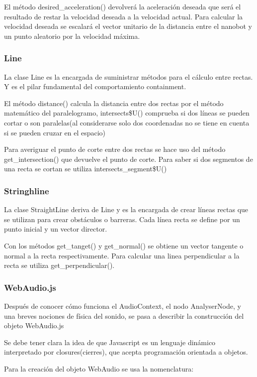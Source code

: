 El método desired\_acceleration() devolverá la aceleración deseada que será el resultado de restar la velocidad deseada a la velocidad actual. Para calcular la velocidad deseada se escalará el vector unitario de la distancia entre el nanobot y un punto aleatorio por la velocidad máxima. 

\subsubsection{Line}
\label{sec:line}
La clase Line es la encargada de suministrar métodos para el cálculo entre rectas. Y es el pilar fundamental del comportamiento containment.

El método distance() calcula la distancia entre dos rectas por el método matemático del paralelogramo, intersects\$U() comprueba si dos líneas se pueden cortar o son paralelas(al considerarse solo dos coordenadas no se tiene en cuenta si se pueden cruzar en el espacio)

Para averiguar el punto de corte entre dos rectas se hace uso del método get\_intersection() que devuelve el punto de corte. Para saber si dos segmentos de una recta se cortan se utiliza intersects\_segment\$U()

\subsubsection{Stringhline}
\label{sec:stringhline}
La clase StraightLine deriva de Line y es la encargada de crear  líneas rectas que se utilizan para crear obstáculos o barreras. Cada línea recta se define por un punto inicial y un vector director. 

Con los métodos get\_tanget() y get\_normal() se obtiene un vector tangente o normal a la recta respectivamente. Para calcular una linea perpendicular a la recta se utiliza get\_perpendicular().

\subsubsection{WebAudio.js}
\label{sec:webaudio}
Después de conocer cómo funciona el AudioContext, el nodo AnalyserNode, y una breves nociones de física del sonido, se pasa a describir la construcción del objeto WebAudio.js


Se debe tener clara la idea de que Javascript es un lenguaje dinámico interpretado por closures(cierres), que acepta programación orientada a objetos.

Para la creación del objeto WebAudio se usa la nomenclatura:

